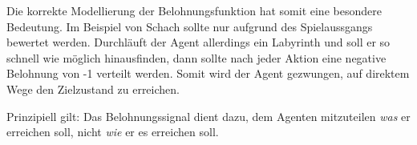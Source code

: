 \par 
Die korrekte Modellierung der Belohnungsfunktion hat somit eine besondere Bedeutung. Im Beispiel von Schach sollte nur aufgrund des Spielaussgangs bewertet werden. Durchläuft der Agent allerdings ein Labyrinth und soll er so schnell wie möglich hinausfinden, dann sollte nach jeder Aktion eine negative Belohnung von -1 verteilt werden. Somit wird der Agent gezwungen, auf direktem Wege den Zielzustand zu erreichen.
\par 
Prinzipiell gilt: Das Belohnungssignal dient dazu, dem Agenten mitzuteilen \textit{was} er erreichen soll, nicht \textit{wie} er es erreichen soll\cite[S.~54]{Sutton1998}.